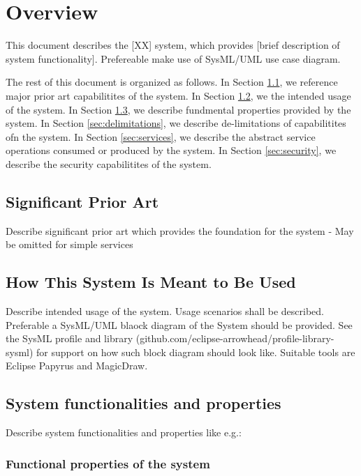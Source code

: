 \documentclass[a4paper]{arrowhead}
\begin{document}
\section{Overview}
\label{sec:overview}
\color{red}
This document describes the [XX] system, which provides [brief
description of system functionality]. Prefereable make use of SysML/UML 
use case diagram. 
\color{black}

The rest of this document is organized as follows.
In Section \ref{sec:prior_art}, we reference major prior art capabilitites
of the system.
In Section \ref{sec:use}, we the intended usage of the system.
In Section \ref{sec:properties}, we describe fundmental properties
provided by the system.
In Section \ref{sec:delimitations}, we describe de-limitations of capabilitites
ofn the system.
In Section \ref{sec:services}, we describe the abstract service
operations consumed or produced by the system.
In Section \ref{sec:security}, we describe the security capabilitites
of the system.

\newpage

\subsection{Significant Prior Art}
\label{sec:prior_art}

\color{red}
Describe significant prior art which provides the
foundation for the system - May be omitted for simple services
\color{black}  

\subsection{How This System Is Meant to Be Used}
\label{sec:use}

\color{red}
Describe intended usage of the system. Usage scenarios
shall be described. Preferable a SysML/UML blaock diagram of the
System should be provided. See the SysML profile and library
(github.com/eclipse-arrowhead/profile-library-sysml) for
support on how such block diagram should look like. Suitable tools are
Eclipse Papyrus and MagicDraw.
\color{black}  

\subsection{System functionalities and properties}
\label{sec:properties}

\color{red}
Describe system functionalities and properties like e.g.:
\subsubsection {Functional properties of the system}
\end{document}
